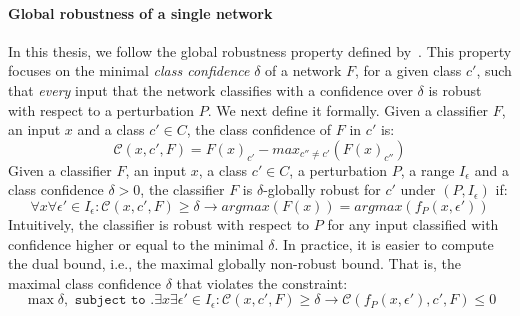 \paragraph{Global robustness of a single network}
In this thesis, we follow the global robustness property defined by~\cite{DECISIONBOUND}.
This property focuses on the minimal \emph{class confidence} $\delta$ of a network $F$, for a given class $c'$, such that \emph{every} input that the network classifies with a confidence over $\delta$ is robust with respect to a perturbation $P$. We next define it formally.
Given a classifier $F$, an input $x$ and a class $c'\in{C}$, the class confidence of $F$ in $c'$ is:
$$\mathcal{C}(x,c',F)=F(x)_{c'}-max_{c''\ne c'}(F(x)_{c''})$$
Given a classifier $F$, an input $x$, a class $c'\in{C}$, a perturbation $P$, a range $I_\epsilon$ and a class confidence $\delta>0$, the classifier $F$ is $\delta$-globally robust for $c'$ under $(P,I_\epsilon)$ if:\\
$$\forall{x}\forall{\epsilon'}\in{I_\epsilon}:    \mathcal{C}(x,c',F) \geq \delta \rightarrow argmax(F(x)) = argmax(f_P(x,\epsilon')) $$
Intuitively, the classifier is robust with respect to $P$ for any input classified with confidence higher or equal to the minimal $\delta$. In practice, it is easier to compute the dual bound, i.e., the maximal globally non-robust bound. That is, the maximal class confidence $\delta$ that violates the constraint:
$$\max{\delta}, \texttt{ subject to }. \exists{x}\exists{\epsilon'}\in{I_\epsilon}: \mathcal{C}(x,c',F) \geq \delta \rightarrow \mathcal{C}(f_P(x,\epsilon'),c',F)\leq 0$$

